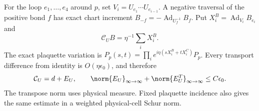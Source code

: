For the loop $e_1,\ldots,e_4$ around $p$, set
$V_i=U_{e_1}\cdots U_{e_{i-1}}$.
A negative traversal of the positive bond $f$ has exact chart
increment $B_{-f}=-\operatorname{Ad}_{U_f^{-1}}B_f$.
Put $X_i^B=\operatorname{Ad}_{V_i}B_{e_i}$ and
\begin{equation}\label{nw-curl}
 \mathcal C_U B=\eta^{-1}\sum_iX_i^B.
\end{equation}
The exact plaquette variation is
$P_p(s,t)=\prod_i e^{i\eta(sX_i^B+tX_i^C)}P_p$.
Every transport difference from identity is $O(\eta\epsilon_0)$,
and therefore
\begin{equation}\label{nw-curl-difference}
 \mathcal C_U=d+E_U,\qquad
 \norm{E_U}_{\infty\to\infty}
       +\norm{E_U^T}_{\infty\to\infty}\le C\epsilon_0.
\end{equation}
The transpose norm uses physical measure. Fixed plaquette incidence
also gives the same estimate in a weighted physical-cell Schur norm.

